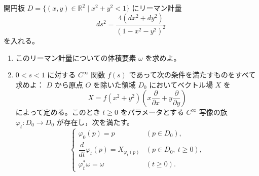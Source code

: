 \documentclass[12pt]{jlreq}
\newcommand{\R}{\mathbb{R}}
\begin{document}
開円板 \(D=\{(x,y)\in\R^2\mid x^2+y^2<1\}\) にリーマン計量
\[
  ds^2=\frac{4(dx^2+dy^2)}{(1-x^2-y^2)^2}
\]
を入れる。

\begin{enumerate}
  \item このリーマン計量についての体積要素 \(\omega\) を求めよ。
  \item \(0<s<1\) に対する \(C^\infty\) 関数 \(f(s)\) であって次の条件を満たすものをすべて求めよ：
  \(D\) から原点 \(O\) を除いた領域 \(D_0\) においてベクトル場 \(X\) を
  \[
    X=f(x^2+y^2)\left(x\frac{\partial}{\partial x}+y\frac{\partial}{\partial y}\right)
  \]
  によって定める。このとき \(t\ge0\) をパラメータとする \(C^\infty\) 写像の族
  \(\varphi_t:D_0\to D_0\) が存在し，次を満たす。
  \[
  \begin{cases}
    \varphi_0(p)=p & (p\in D_0),\\
    \dfrac{d}{dt}\varphi_t(p)=X_{\varphi_t(p)} & (p\in D_0,\ t\ge0),\\
    \varphi_t^*\omega=\omega & (t\ge0).
  \end{cases}
  \]
\end{enumerate}
\end{document}
